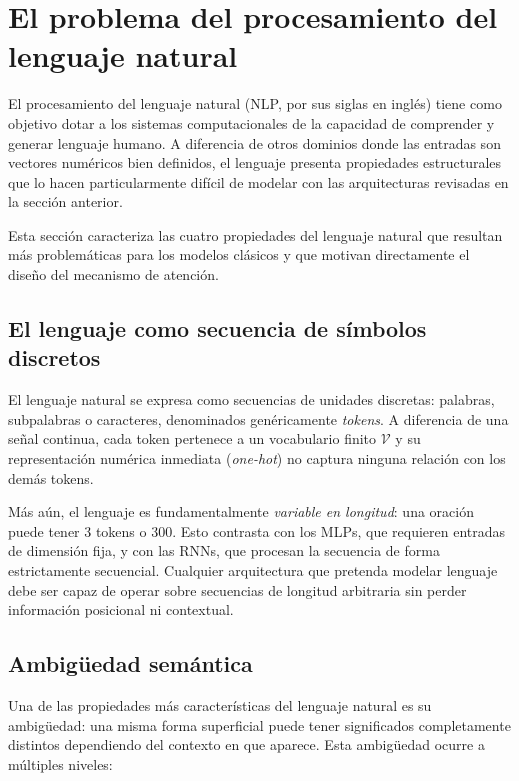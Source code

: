 \section{El problema del procesamiento del lenguaje natural}
\label{sec:problema_nlp}

El procesamiento del lenguaje natural (NLP, por sus siglas en inglés) tiene
como objetivo dotar a los sistemas computacionales de la capacidad de
comprender y generar lenguaje humano. A diferencia de otros dominios donde
las entradas son vectores numéricos bien definidos, el lenguaje presenta
propiedades estructurales que lo hacen particularmente difícil de modelar
con las arquitecturas revisadas en la sección anterior.

Esta sección caracteriza las cuatro propiedades del lenguaje natural que
resultan más problemáticas para los modelos clásicos y que motivan
directamente el diseño del mecanismo de atención.

\subsection{El lenguaje como secuencia de símbolos discretos}
\label{subsec:lenguaje_secuencia}

El lenguaje natural se expresa como secuencias de unidades discretas:
palabras, subpalabras o caracteres, denominados genéricamente
\textit{tokens}. A diferencia de una señal continua, cada token pertenece
a un vocabulario finito $\mathcal{V}$ y su representación numérica inmediata
(\textit{one-hot}) no captura ninguna relación con los demás tokens.

Más aún, el lenguaje es fundamentalmente \textit{variable en longitud}: una
oración puede tener 3 tokens o 300. Esto contrasta con los MLPs, que
requieren entradas de dimensión fija, y con las RNNs, que procesan la
secuencia de forma estrictamente secuencial. Cualquier arquitectura que
pretenda modelar lenguaje debe ser capaz de operar sobre secuencias de
longitud arbitraria sin perder información posicional ni contextual.

\subsection{Ambigüedad semántica}
\label{subsec:ambiguedad}

Una de las propiedades más características del lenguaje natural es su
ambigüedad: una misma forma superficial puede tener significados
completamente distintos dependiendo del contexto en que aparece. Esta
ambigüedad ocurre a múltiples niveles:

